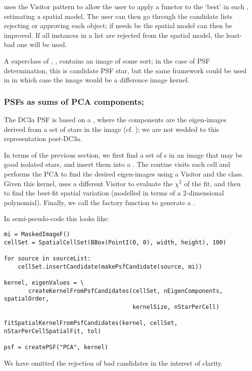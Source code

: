  uses the Visitor pattern \citep{GoF} to allow the user to apply a functor to the `best'
 in each , estimating a spatial model.  The user can then go through the
candidate lists rejecting or approving each object; if needs be the spatial model can then be improved.  If all
instances in a list are rejected from the spatial model, the least-bad one will be used.

A superclass of , , contains an image
of some sort; in the case of PSF determination, this is candidate PSF star, but the
same framework could be used in  in which case the image would
be a difference image kernel.


\subsubsection{PSFs as sums of PCA components; }

The DC3a PSF is based on a , where
the components are the eigen-images derived from a set of stars in the image (cf. \citet{photoADASS});
we are not wedded to this representation post-DC3a.

In terms of the previous section,  we first find a set of s in an image
that may be good isolated stars,  and insert them into a .  The
routine  visits each cell and performs the PCA
to find the desired eigen-images using a Visitor and the  class.
Given this kernel,  uses a different
Visitor to evaluate the $\chi^2$ of the fit, and then  to find
the best-fit spatial variation (modelled in terms of a 2-dimensional polynomial).  Finally,
we call the  factory function to generate a .

In semi-pseudo-code this looks like:
\begin{center}
  \begin{minipage}{13cm}
    \small
\begin{verbatim}
mi = MaskedImageF()
cellSet = SpatialCellSet(BBox(PointI(0, 0), width, height), 100)

for source in sourceList:
    cellSet.insertCandidate(makePsfCandidate(source, mi))

kernel, eigenValues = \
       createKernelFromPsfCandidates(cellSet, nEigenComponents, spatialOrder,
                                     kernelSize, nStarPerCell)

fitSpatialKernelFromPsfCandidates(kernel, cellSet, nStarPerCellSpatialFit, tol)

psf = createPSF("PCA", kernel)
\end{verbatim}
  \end{minipage}
\end{center}
We have omitted the rejection of bad candidates in the interest of clarity.
